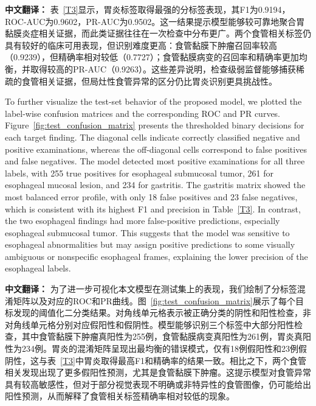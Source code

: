 \documentclass[Afour,sagev,times]{sagej}
\begin{document}
\textbf{中文翻译：} 表~\ref{T3}显示，胃炎标签取得最强的分标签表现，其F1为0.9194，ROC-AUC为0.9602，PR-AUC为0.9502。这一结果提示模型能够较可靠地聚合胃黏膜炎症相关证据，而此类证据往往在一次检查中分布更广。两个食管相关标签仍具有较好的临床可用表现，但识别难度更高：食管黏膜下肿瘤召回率较高（0.9239），但精确率相对较低（0.7727）；食管黏膜病变的召回率和精确率更加均衡，并取得较高的PR-AUC（0.9263）。这些差异说明，检查级弱监督能够捕获稀疏的食管相关证据，但局灶性食管异常的区分仍比胃炎识别更具挑战性。

To further visualize the test-set behavior of the proposed model, we plotted the label-wise confusion matrices and the corresponding ROC and PR curves. Figure~\ref{fig:test_confusion_matrix} presents the thresholded binary decisions for each target finding. The diagonal cells indicate correctly classified negative and positive examinations, whereas the off-diagonal cells correspond to false positives and false negatives. The model detected most positive examinations for all three labels, with 255 true positives for esophageal submucosal tumor, 261 for esophageal mucosal lesion, and 234 for gastritis. The gastritis matrix showed the most balanced error profile, with only 18 false positives and 23 false negatives, which is consistent with its highest F1 and precision in Table~\ref{T3}. In contrast, the two esophageal findings had more false-positive predictions, especially esophageal submucosal tumor. This suggests that the model was sensitive to esophageal abnormalities but may assign positive predictions to some visually ambiguous or nonspecific esophageal frames, explaining the lower precision of the esophageal labels.

\textbf{中文翻译：} 为了进一步可视化本文模型在测试集上的表现，我们绘制了分标签混淆矩阵以及对应的ROC和PR曲线。图~\ref{fig:test_confusion_matrix}展示了每个目标发现的阈值化二分类结果。对角线单元格表示被正确分类的阴性和阳性检查，非对角线单元格分别对应假阳性和假阴性。模型能够识别三个标签中大部分阳性检查，其中食管黏膜下肿瘤真阳性为255例，食管黏膜病变真阳性为261例，胃炎真阳性为234例。胃炎的混淆矩阵呈现出最均衡的错误模式，仅有18例假阳性和23例假阴性，这与表~\ref{T3}中胃炎取得最高F1和精确率的结果一致。相比之下，两个食管相关发现出现了更多假阳性预测，尤其是食管黏膜下肿瘤。这提示模型对食管异常具有较高敏感性，但对于部分视觉表现不明确或非特异性的食管图像，仍可能给出阳性预测，从而解释了食管相关标签精确率相对较低的现象。
\end{document}
